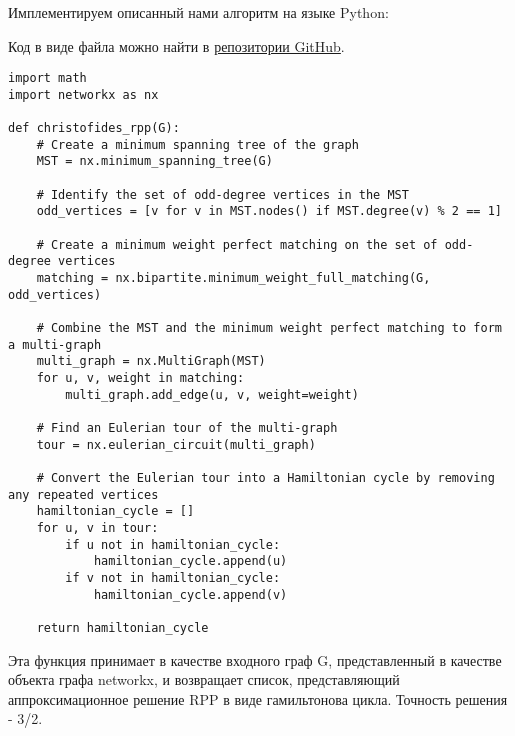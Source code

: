 Имплементируем описанный нами алгоритм на языке Python:

Код в виде файла можно найти в \href{https://github.com/stepan-karpov/compl-project/blob/main/code/main.py}{репозитории GitHub}.

\begin{verbatim}
import math
import networkx as nx

def christofides_rpp(G):
    # Create a minimum spanning tree of the graph
    MST = nx.minimum_spanning_tree(G)

    # Identify the set of odd-degree vertices in the MST
    odd_vertices = [v for v in MST.nodes() if MST.degree(v) % 2 == 1]

    # Create a minimum weight perfect matching on the set of odd-degree vertices
    matching = nx.bipartite.minimum_weight_full_matching(G, odd_vertices)

    # Combine the MST and the minimum weight perfect matching to form a multi-graph
    multi_graph = nx.MultiGraph(MST)
    for u, v, weight in matching:
        multi_graph.add_edge(u, v, weight=weight)

    # Find an Eulerian tour of the multi-graph
    tour = nx.eulerian_circuit(multi_graph)

    # Convert the Eulerian tour into a Hamiltonian cycle by removing any repeated vertices
    hamiltonian_cycle = []
    for u, v in tour:
        if u not in hamiltonian_cycle:
            hamiltonian_cycle.append(u)
        if v not in hamiltonian_cycle:
            hamiltonian_cycle.append(v)

    return hamiltonian_cycle
\end{verbatim}
Эта функция принимает в качестве входного граф G, представленный в качестве объекта графа networkx, и возвращает список, представляющий аппроксимационное решение RPP в виде гамильтонова цикла. Точность решения - 3/2.
